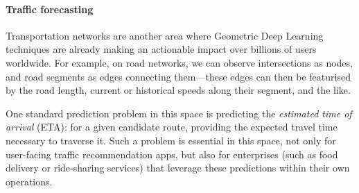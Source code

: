 \paragraph{Traffic forecasting} Transportation networks are another area where Geometric Deep Learning techniques are already making an actionable impact over billions of users worldwide. For example, on road networks, we can observe intersections as nodes, and road segments as edges connecting them---these edges can then be featurised by the road length, current or historical speeds along their segment, and the like. 

One standard prediction problem in this space is predicting the \emph{estimated time of arrival} (ETA): for a given candidate route, providing the expected travel time necessary to traverse it. Such a problem is essential in this space, not only for user-facing traffic recommendation apps, but also for enterprises (such as food delivery or ride-sharing services) that leverage these predictions within their own operations.

